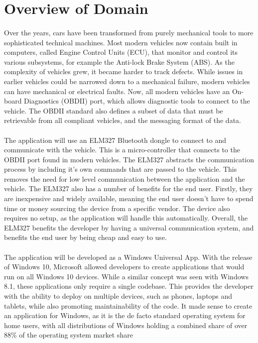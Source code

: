 \section{Overview of Domain}
	\paragraph{}{
	Over the years, cars have been transformed from purely mechanical tools to more sophisticated technical machines. Most modern vehicles now contain built in computers, called Engine Control Units (ECU), that monitor and control its various subsystems, for example the Anti-lock Brake System (ABS). As the complexity of vehicles grew, it became harder to track defects. While issues in earlier vehicles could be narrowed down to a mechanical failure, modern vehicles can have mechanical or electrical faults. Now, all modern vehicles have an On-board Diagnostics (OBDII) port, which allows diagnostic tools to connect to the vehicle. The OBDII standard also defines a subset of data that must be retrievable from all compliant vehicles, and the messaging format of the data.		 
	}
	\paragraph{}{
	The application will use an ELM327 Bluetooth dongle to connect to and communicate with the vehicle. This is a micro-controller that connects to the OBDII port found in modern vehicles. The ELM327 abstracts the communication process by including it's own commands that are passed to the vehicle. This removes the need for low level communication between the application and the vehicle. The ELM327 also has a number of benefits for the end user. Firstly, they are inexpensive and widely available, meaning the end user doesn't have to spend time or money sourcing the device from a specific vendor. The device also requires no setup, as the application will handle this automatically. Overall, the ELM327 benefits the developer by having a universal communication system, and benefits the end user by being cheap and easy to use.
	}
	\paragraph{}{
	The application will be developed as a Windows Universal App. With the release of Windows 10, Microsoft allowed developers to create applications that would run on all Windows 10 devices. While a similar concept was seen with Windows 8.1, these applications only require a single codebase. This provides the developer with the ability to deploy on multiple devices, such as phones, laptops and tablets, while also promoting maintainability of the code. It made sense to create an application for Windows, as it is the de facto standard operating system for home users, with all distributions of Windows holding a combined share of over 88{\%} of the operating system market share %
	}
